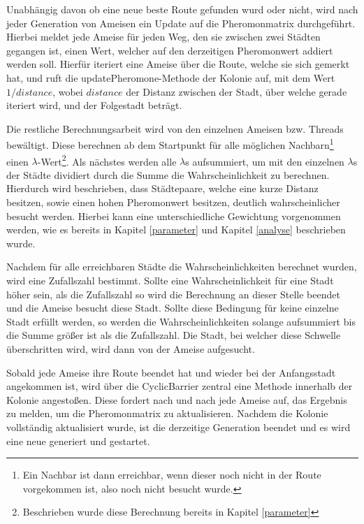 Unabhängig davon ob eine neue beste Route gefunden wurd oder nicht, wird nach jeder Generation von Ameisen ein Update auf die Pheromonmatrix durchgeführt. Hierbei meldet jede Ameise für jeden Weg, den sie zwischen zwei Städten gegangen ist, einen Wert, welcher auf den derzeitigen Pheromonwert addiert werden soll. Hierfür iteriert eine Ameise über die Route, welche sie sich gemerkt hat, und ruft die updatePheromone-Methode der Kolonie auf, mit dem Wert $1/distance$, wobei $distance$ der Distanz zwischen der Stadt, über welche gerade iteriert wird, und der Folgestadt beträgt. 

Die restliche Berechnungsarbeit wird von den einzelnen Ameisen bzw. Threads bewältigt. Diese berechnen ab dem Startpunkt für alle möglichen Nachbarn\footnote{Ein Nachbar ist dann erreichbar, wenn dieser noch nicht in der Route vorgekommen ist, also noch nicht besucht wurde.} einen $\lambda$-Wert\footnote{Beschrieben wurde diese Berechnung bereits in Kapitel \ref{parameter}}. 
Als nächstes werden alle $\lambda$s aufsummiert, um mit den einzelnen $\lambda$s der Städte dividiert durch die Summe die Wahrscheinlichkeit zu berechnen. Hierdurch wird beschrieben, dass Städtepaare, welche eine kurze Distanz besitzen, sowie einen hohen Pheromonwert besitzen, deutlich wahrscheinlicher besucht werden. Hierbei kann eine unterschiedliche Gewichtung vorgenommen werden, wie es bereits in Kapitel \ref{parameter} und Kapitel \ref{analyse} beschrieben wurde.

Nachdem für alle erreichbaren Städte die Wahrscheinlichkeiten berechnet wurden, wird eine Zufallszahl bestimmt. Sollte eine Wahrscheinlichkeit für eine Stadt höher sein, als die Zufallszahl so wird die Berechnung an dieser Stelle beendet und die Ameise besucht diese Stadt. Sollte diese Bedingung für keine einzelne Stadt erfüllt werden, so werden die Wahrscheinlichkeiten solange aufsummiert bis die Summe größer ist als die Zufallszahl. Die Stadt, bei welcher diese Schwelle überschritten wird, wird dann von der Ameise aufgesucht.

Sobald jede Ameise ihre Route beendet hat und wieder bei der Anfangsstadt angekommen ist, wird über die CyclicBarrier zentral eine Methode innerhalb der Kolonie angestoßen. Diese fordert nach und nach jede Ameise auf, das Ergebnis zu melden, um die Pheromonmatrix zu aktualisieren. Nachdem die Kolonie vollständig aktualisiert wurde, ist die derzeitige Generation beendet und es wird eine neue generiert und gestartet.